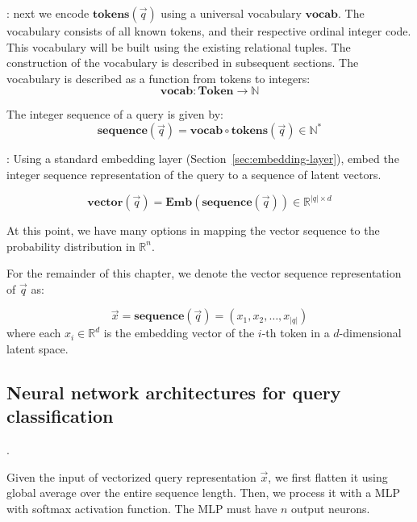 \documentclass[conference]{IEEEtran}
\begin{document}
: next we encode $\mathbf{tokens}(\vec q)$ using a universal
vocabulary $\mathbf{vocab}$.  The vocabulary consists of all known tokens, and their respective
ordinal integer code.  This vocabulary will be built using the existing relational tuples.  The construction of the vocabulary is described in subsequent sections.  The vocabulary is described as a function from tokens to integers:
$$ \mathbf{vocab} : \mathbf{Token} \to \mathbb{N}$$

The integer sequence of a query is given by:
$$
\mathbf{sequence}(\vec q) = \mathbf{vocab}\circ\mathbf{tokens} (\vec q) \in\mathbb{N}^*
$$

:
Using a standard embedding layer (Section~\ref{sec:embedding-layer}), embed the integer sequence representation of the query
to a sequence of latent vectors.

$$
\mathbf{vector}(\vec q) = \mathbf{Emb}(\mathbf{sequence}(\vec q))\in\mathbb{R}^{|q|\times d}
$$

At this point, we have many options in mapping
the vector sequence to the probability distribution
in $\mathbb{R}^n$.


\vspace{2cm}

\noindent\makebox[\linewidth]{\rule{0.5\textwidth}{5pt}}

\vspace{2cm}



For the remainder of this chapter, we denote the vector sequence representation of $\vec q$ as:

$$\vec x = \mathbf{sequence}(\vec q) = (x_1, x_2, \dots, x_{|q|})$$
where each $x_i\in\mathbb{R}^d$ is the embedding vector 
of the $i$-th token in a $d$-dimensional latent space.

\subsection{Neural network architectures for query classification}
\label{sec:architectures}

.

Given the input of vectorized query representation $\vec x$, 
we first flatten it using global average over the entire sequence length.  Then, we process it with a MLP with softmax
activation function.  The MLP must have $n$ output neurons.
\end{document}
